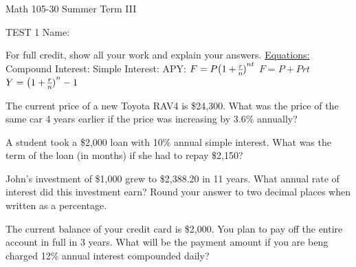 \documentclass[11pt,epsfig]{article}
\begin{document}
Math 105-30 Summer Term III 

TEST 1 \hspace{1.9in} {Name:} {\underline {\hspace{3.5in}}}
\vspace{2pc}

For full credit, show all your work and explain your answers.
\newline
\newline
\underline{Equations:}
\newline
Compound Interest: \hspace{2.5cm}  Simple Interest:   \hspace{2.5cm} APY:
\newline
$F=P\big{(1+\frac{r}{n})}^{nt}$ 
\hspace{3.5cm} $F=P+Prt$
\hspace{3.0cm} $Y=\big{(1+\frac{r}{n})}^{n}-1$

\vspace{2pc}

\begin{problem}{12}
The current price of a new Toyota RAV4 is \$24,300. What was the price of the same car 4 years earlier if the price was increasing by 3.6\% annually? 
\vfill
\end{problem}

\begin{problem}{12}
A student took a \$2,000 loan with 10\% annual simple interest. What was the term of the loan (in months) if she had to repay \$2,150?
\vfill
\end{problem}

\newpage

\begin{problem}{12}
John's investment of \$1,000 grew to \$2,388.20 in 11 years. What annual rate of interest did this investment earn? Round your answer to two decimal places when written as a percentage.

\vfill
\end{problem}


\begin{problem}{13}
The current balance of your credit card is \$2,000. You plan to pay off the entire account in full in 3 years. What will be the payment amount if you are beng charged 12\% annual interest compounded daily?

\vfill
\end{problem}
\end{document}
